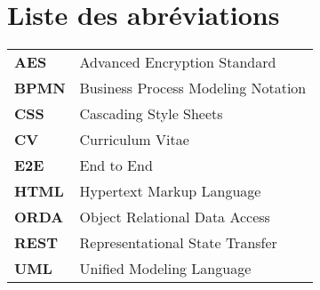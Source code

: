 \chapter*{Liste des abréviations}

\begin{spacing}{1.5}
    
\begin{tabular}{l  l}    
    \textbf{AES} &  Advanced Encryption Standard  \\
    \textbf{BPMN} & Business Process Modeling Notation \\
    \textbf{CSS} & Cascading Style Sheets \\
    \textbf{CV} & Curriculum Vitae \\
    \textbf{E2E} & End to End \\
    \textbf{HTML} & Hypertext Markup Language \\ 
    \textbf{ORDA} & Object Relational Data Access \\
    \textbf{REST} & Representational State Transfer \\
    \textbf{UML} & Unified Modeling Language \\
    
\end{tabular}
\end{spacing}
